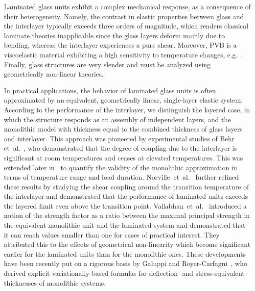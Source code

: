 \documentclass[11pt]{article}
\newcommand{\etal}{et~al.}
\begin{document}
Laminated glass units exhibit a complex mechanical response, as a consequence of
their heterogeneity. Namely, the contrast in elastic properties between glass
and the interlayer typically exceeds three orders of magnitude, which renders
classical laminate theories inapplicable since the glass layers deform mainly
due to bending, whereas the interlayer experiences a pure shear. Moreover, PVB is a
viscoelastic material exhibiting a high sensitivity to temperature changes,
e.g.~\cite{Bennison:1999:FLB}. Finally, glass structures are very slender and
must be analyzed using geometrically non-linear theories.

In practical applications, the behavior of laminated glass units is often
approximated by an equivalent, geometrically linear, single-layer elastic
system. According to the performance of the interlayer, we distinguish the
layered case, in which the structure responds as an assembly of independent
layers, and the monolithic model with thickness equal to the combined thickness
of glass layers and interlayer. This approach was pioneered by experimental
studies of Behr \etal~\cite{Behr:1985:LGU}, who demonstrated that the degree of
coupling due to the interlayer is significant at room temperatures and ceases at
elevated temperatures. This was extended later in~\cite{Behr:1993:SBA} to
quantify the validity of the monolithic approximation in terms of temperature
range and load duration. Norville~\etal~\cite{Norville:1998:BSL} further refined
these results by studying the shear coupling around the transition temperature
of the interlayer and demonstrated that the performance of laminated units
exceeds the layered limit even above the transition point.
Vallabhan~\etal~\cite{Vallabhan:1987:SLG} introduced a notion of the strength
factor as a ratio between the maximal principal strength in the equivalent
monolithic unit and the laminated system and demonstrated that it can reach
values smaller than one for cases of practical interest. They attributed this to
the effects of geometrical non-linearity which become significant earlier for
the laminated units than for the monolithic ones. These developments have been
recently put on a rigorous basis by Galuppi and
Royer-Carfagni~\cite{Galuppi:2012:ETL}, who derived explicit variationally-based
formulas for deflection- and stress-equivalent thicknesses of monolithic
systems.
\end{document}
